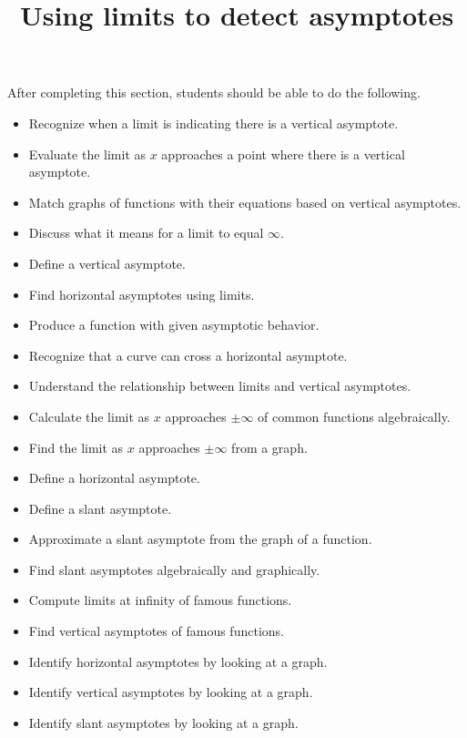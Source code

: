\documentclass{ximera}
\title{Using limits to detect asymptotes}
\begin{document}
\begin{abstract}
\end{abstract}

\maketitle

\begin{sectionOutcomes}

After completing this section, students should be able to do the following.

\begin{itemize}
\item Recognize when a limit is indicating there is a vertical asymptote.
\item Evaluate the limit as $x$ approaches a point where there is a vertical asymptote.
\item Match graphs of functions with their equations based on vertical asymptotes.
\item Discuss what it means for a limit to equal $\infty$.
\item Define a vertical asymptote.
\item Find horizontal asymptotes using limits.
\item Produce a function with given asymptotic behavior.
\item Recognize that a curve can cross a horizontal asymptote.
\item Understand the relationship between limits and vertical asymptotes.
\item Calculate the limit as $x$ approaches $\pm \infty$ of common functions algebraically.
\item Find the limit as $x$ approaches $\pm \infty$ from a graph.
\item Define a horizontal asymptote.
\item Define a slant asymptote.
\item Approximate a slant asymptote from the graph of a
  function.
\item Find slant asymptotes algebraically and graphically.
\item Compute limits at infinity of famous functions.
\item Find vertical asymptotes of famous functions.
\item Identify horizontal asymptotes by looking at a graph.
\item Identify vertical asymptotes by looking at a graph.
\item Identify slant asymptotes by looking at a graph.
\end{itemize}
\end{sectionOutcomes}
\end{document}

